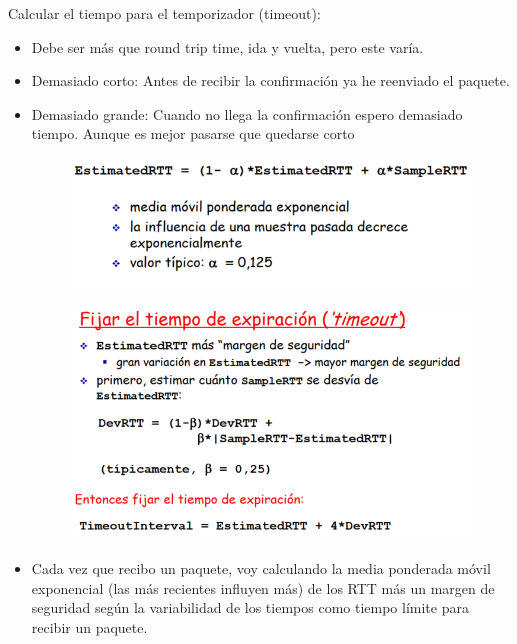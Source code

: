 \documentclass[12pt, twoside, openright]{report} %
\begin{document}
Calcular el tiempo para el temporizador (timeout):

\begin{itemize}
	\item Debe ser más que round trip time, ida y vuelta, pero este varía.
	\item Demasiado corto: Antes de recibir la confirmación ya he reenviado
	      el paquete.
	\item Demasiado grande: Cuando no llega la confirmación espero demasiado
	      tiempo. Aunque es mejor pasarse que quedarse corto
	      \begin{figure}[H]
		      {\includegraphics[scale=.45]{Untitled 6.png}}
	      \end{figure}
	      \begin{figure}[H]
		      {\includegraphics[scale=.45]{Untitled 7.png}}
	      \end{figure}
	\item Cada vez que recibo un paquete, voy calculando la media ponderada
	      móvil exponencial (las más recientes influyen más) de los RTT más
	      un margen de seguridad según la variabilidad de los tiempos como
	      tiempo límite para recibir un paquete.
\end{itemize}
\end{document}
